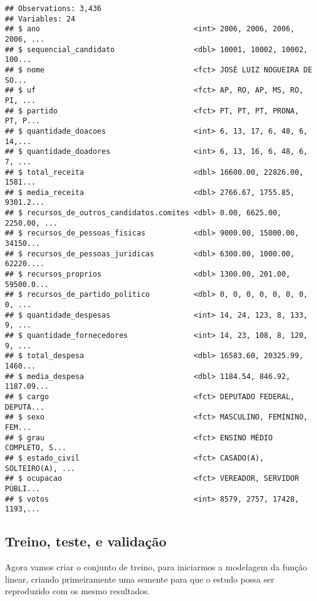 \documentclass[]{article}
\newenvironment{Shaded}{\begin{snugshade}}{\end{snugshade}}
\newcommand{\KeywordTok}[1]{\textcolor[rgb]{0.13,0.29,0.53}{\textbf{#1}}}
\newcommand{\DecValTok}[1]{\textcolor[rgb]{0.00,0.00,0.81}{#1}}
\newcommand{\StringTok}[1]{\textcolor[rgb]{0.31,0.60,0.02}{#1}}
\newcommand{\CommentTok}[1]{\textcolor[rgb]{0.56,0.35,0.01}{\textit{#1}}}
\newcommand{\OperatorTok}[1]{\textcolor[rgb]{0.81,0.36,0.00}{\textbf{#1}}}
\newcommand{\NormalTok}[1]{#1}
\begin{document}
\begin{verbatim}
## Observations: 3,436
## Variables: 24
## $ ano                                   <int> 2006, 2006, 2006, 2006, ...
## $ sequencial_candidato                  <dbl> 10001, 10002, 10002, 100...
## $ nome                                  <fct> JOSÉ LUIZ NOGUEIRA DE SO...
## $ uf                                    <fct> AP, RO, AP, MS, RO, PI, ...
## $ partido                               <fct> PT, PT, PT, PRONA, PT, P...
## $ quantidade_doacoes                    <int> 6, 13, 17, 6, 48, 6, 14,...
## $ quantidade_doadores                   <int> 6, 13, 16, 6, 48, 6, 7, ...
## $ total_receita                         <dbl> 16600.00, 22826.00, 1581...
## $ media_receita                         <dbl> 2766.67, 1755.85, 9301.2...
## $ recursos_de_outros_candidatos.comites <dbl> 0.00, 6625.00, 2250.00, ...
## $ recursos_de_pessoas_fisicas           <dbl> 9000.00, 15000.00, 34150...
## $ recursos_de_pessoas_juridicas         <dbl> 6300.00, 1000.00, 62220....
## $ recursos_proprios                     <dbl> 1300.00, 201.00, 59500.0...
## $ recursos_de_partido_politico          <dbl> 0, 0, 0, 0, 0, 0, 0, 0, ...
## $ quantidade_despesas                   <int> 14, 24, 123, 8, 133, 9, ...
## $ quantidade_fornecedores               <int> 14, 23, 108, 8, 120, 9, ...
## $ total_despesa                         <dbl> 16583.60, 20325.99, 1460...
## $ media_despesa                         <dbl> 1184.54, 846.92, 1187.09...
## $ cargo                                 <fct> DEPUTADO FEDERAL, DEPUTA...
## $ sexo                                  <fct> MASCULINO, FEMININO, FEM...
## $ grau                                  <fct> ENSINO MÉDIO COMPLETO, S...
## $ estado_civil                          <fct> CASADO(A), SOLTEIRO(A), ...
## $ ocupacao                              <fct> VEREADOR, SERVIDOR PÚBLI...
## $ votos                                 <int> 8579, 2757, 17428, 1193,...
\end{verbatim}

\subsection{Treino, teste, e validação}\label{treino-teste-e-validacao}

Agora vamos criar o conjunto de treino, para iniciarmos a modelagem da
função linear, criando primeiramente uma semente para que o estudo possa
ser reproduzido com os mesmo resultados.

\begin{Shaded}
\end{Shaded}
\end{document}
